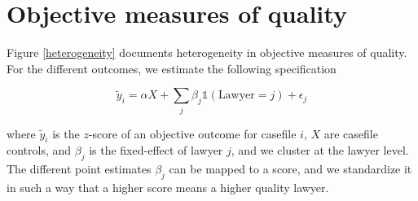 \documentclass[oneside,11pt]{article}
\begin{document}
\section{Objective measures of quality}

Figure \ref{heterogeneity} documents heterogeneity in objective measures of quality. For the different outcomes, we estimate the following specification

\[ \widetilde{y}_i = \alpha X + \sum_j\beta_j\mathds{1}(\text{Lawyer} = j) + \epsilon_j\]

where $\widetilde{y}_i$ is the $z$-score of an objective outcome for casefile $i$, $X$ are casefile controls, and $\beta_j$ is the fixed-effect of lawyer $j$, and we cluster at the lawyer level. The different point estimates $\beta_j$ can be mapped to a score, and we standardize it in such a way that a higher score means a higher quality lawyer. 
\end{document}
